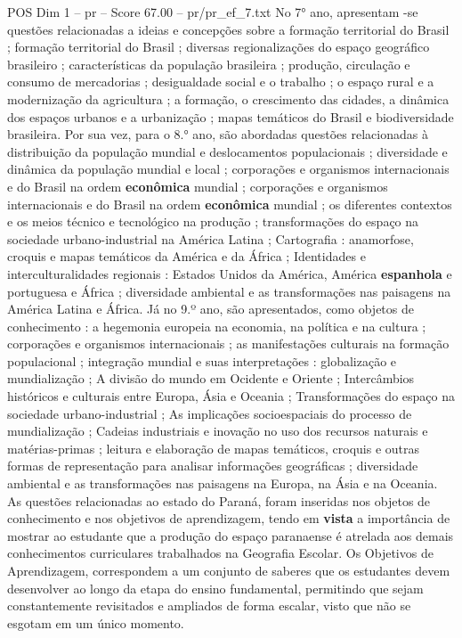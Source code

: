 \begin{textsample}{POS Dim 1 – pr – Score 67.00 – pr/pr\_ef\_7.txt}
No 7{\EmojiFont °} ano, apresentam -se questões relacionadas a ideias e concepções sobre a formação territorial do Brasil ; formação territorial do Brasil ; diversas regionalizações do espaço geográfico brasileiro ; características da população brasileira ; produção, circulação e consumo de mercadorias ; desigualdade social e o trabalho ; o espaço rural e a modernização da agricultura ; a formação, o crescimento das cidades, a dinâmica dos espaços urbanos e a urbanização ; mapas temáticos do Brasil e biodiversidade brasileira.
Por sua vez, para o 8.{\EmojiFont °} ano, são abordadas questões relacionadas à distribuição da população mundial e deslocamentos populacionais ; diversidade e dinâmica da população mundial e local ; corporações e organismos internacionais e do Brasil na ordem \textbf{econômica} mundial ; corporações e organismos internacionais e do Brasil na ordem \textbf{econômica} mundial ; os diferentes contextos e os meios técnico e tecnológico na produção ; transformações do espaço na sociedade urbano-industrial na América Latina ; Cartografia : anamorfose, croquis e mapas temáticos da América e da África ; Identidades e interculturalidades regionais : Estados Unidos da América, América \textbf{espanhola} e portuguesa e África ; diversidade ambiental e as transformações nas paisagens na América Latina e África.
Já no 9.º ano, são apresentados, como objetos de conhecimento : a hegemonia europeia na economia, na política e na cultura ; corporações e organismos internacionais ; as manifestações culturais na formação populacional ; integração mundial e suas interpretações : globalização e mundialização ; A divisão do mundo em Ocidente e Oriente ; Intercâmbios históricos e culturais entre Europa, Ásia e Oceania ; Transformações do espaço na sociedade urbano-industrial ; As implicações socioespaciais do processo de mundialização ; Cadeias industriais e inovação no uso dos recursos naturais e matérias-primas ; leitura e elaboração de mapas temáticos, croquis e outras formas de representação para analisar informações geográficas ; diversidade ambiental e as transformações nas paisagens na Europa, na Ásia e na Oceania.
As questões relacionadas ao estado do Paraná, foram inseridas nos objetos de conhecimento e nos objetivos de aprendizagem, tendo em \textbf{vista} a importância de mostrar ao estudante que a produção do espaço paranaense é atrelada aos demais conhecimentos curriculares trabalhados na Geografia Escolar.
Os Objetivos de Aprendizagem, correspondem a um conjunto de saberes que os estudantes devem desenvolver ao longo da etapa do ensino fundamental, permitindo que sejam constantemente revisitados e ampliados de forma escalar, visto que não se esgotam em um único momento.

\end{textsample}
